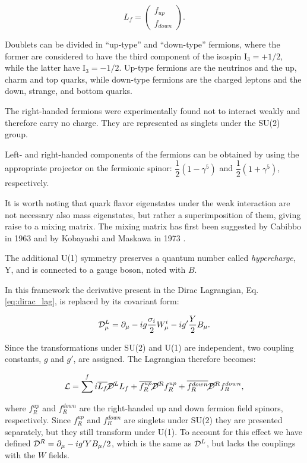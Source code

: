 \begin{equation}
L_f = \left(\begin{array}{c}f_{up} \\f_{down}\end{array}\right).
\end{equation}

Doublets can be divided in ``up-type'' and ``down-type'' fermions, where the former are considered to have the third component of the isospin I$_3 = +1/2$, while the latter have I$_3 = -1/2$. Up-type fermions are the neutrinos and the up, charm and top quarks, while down-type fermions are the charged leptons and the down, strange, and bottom quarks.

The right-handed fermions were experimentally found not to interact weakly and therefore carry no charge. They are represented as singlets under the SU(2) group.

Left- and right-handed components of the fermions can be obtained by using the appropriate projector on the fermionic spinor: $\dfrac{1}{2}(1-\gamma^5)$ and $\dfrac{1}{2}(1+\gamma^5)$, respectively.

It is worth noting that quark flavor eigenstates under the weak interaction are not necessary also mass eigenstates, but rather a superimposition of them, giving raise to a mixing matrix. The mixing matrix has first been suggested by Cabibbo in 1963 \cite{Cabibbo:1963yz} and by Kobayashi and Maskawa in 1973 \cite{Kobayashi:1973fv}.

The additional U(1) symmetry preserves a quantum number called \emph{hypercharge}, Y, and is connected to a gauge boson, noted with $B$. 

In this framework the derivative present in the Dirac Lagrangian, Eq. \ref{eq:dirac_lag}, is replaced by its covariant form:

\begin{equation}
\mathcal{D}^L_\mu = \partial_\mu - ig\dfrac{\sigma_i}{2}W^i_\mu - ig'\dfrac{Y}{2}B_\mu.
\end{equation}

Since the transformations under SU(2) and U(1) are independent, two coupling constants, $g$ and $g'$, are assigned. The Lagrangian therefore becomes:

\begin{equation}
\mathcal{L} = \sum^f i \overline{L_f}\cancel{\mathcal{D}}^LL_f + \overline{f^{up}_R}\cancel{\mathcal{D}}^Rf^{up}_R  + \overline{f^{down}_R}\cancel{\mathcal{D}}^Rf^{down}_R,
\end{equation}

where $f^{up}_R$ and $f^{down}_R$ are the right-handed up and down fermion field spinors, respectively. Since $f^{up}_R$ and $f^{down}_R$ are singlets under SU(2) they are presented separately, but they still transform under U(1). To account for this effect we have defined $\mathcal{D}^R = \partial_\mu - ig'YB_\mu/2$, which is the same as $\mathcal{D}^L$, but lacks the couplings with the $W$ fields. 

